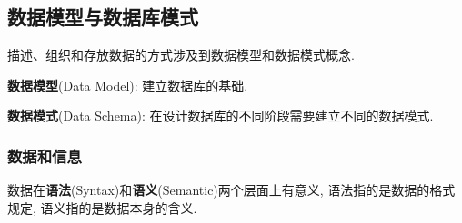     \subsection{数据模型与数据库模式}

        描述、组织和存放数据的方式涉及到数据模型和数据模式概念.

        \textbf{数据模型}(Data Model): 建立数据库的基础.

        \textbf{数据模式}(Data Schema): 在设计数据库的不同阶段需要建立不同的数据模式. 

        \subsubsection{数据和信息}

            数据在\textbf{语法}(Syntax)和\textbf{语义}(Semantic)两个层面上有意义, 语法指的是数据的格式规定, 语义指的是数据本身的含义.
